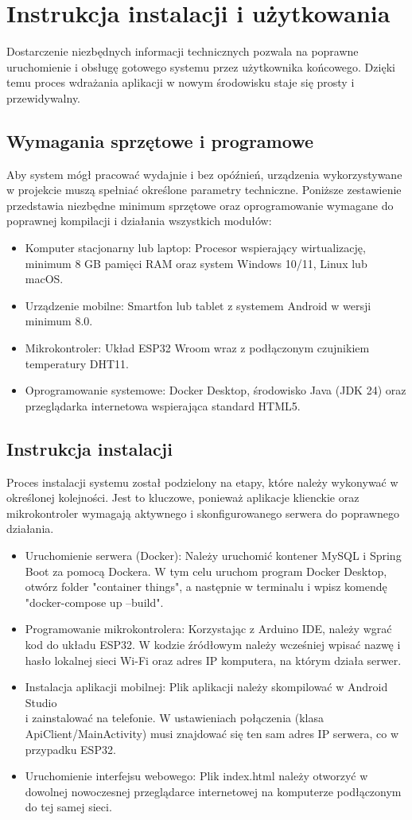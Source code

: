 \chapter{Instrukcja instalacji i użytkowania}
Dostarczenie niezbędnych informacji technicznych pozwala na poprawne uruchomienie i obsługę gotowego systemu przez użytkownika końcowego. Dzięki temu proces wdrażania aplikacji w nowym środowisku staje się prosty i przewidywalny.

\section{Wymagania sprzętowe i programowe}
Aby system mógł pracować wydajnie i bez opóźnień, urządzenia wykorzystywane \\ w projekcie muszą spełniać określone parametry techniczne. Poniższe zestawienie przedstawia niezbędne minimum sprzętowe oraz oprogramowanie wymagane do poprawnej kompilacji i działania wszystkich modułów:
\begin{itemize}
	\item Komputer stacjonarny lub laptop: Procesor wspierający wirtualizację, minimum 8 GB pamięci RAM oraz system Windows 10/11, Linux lub macOS.
	\item Urządzenie mobilne: Smartfon lub tablet z systemem Android w wersji minimum 8.0.
	\item Mikrokontroler: Układ ESP32 Wroom wraz z podłączonym czujnikiem temperatury DHT11.
	\item Oprogramowanie systemowe: Docker Desktop, środowisko Java (JDK 24) oraz przeglądarka internetowa wspierająca standard HTML5.
\end{itemize}
\section{Instrukcja instalacji}
Proces instalacji systemu został podzielony na etapy, które należy wykonywać w określonej kolejności. Jest to kluczowe, ponieważ aplikacje klienckie oraz mikrokontroler wymagają aktywnego i skonfigurowanego serwera do poprawnego działania.
\begin{itemize}
	\item Uruchomienie serwera (Docker): Należy uruchomić kontener MySQL i Spring Boot za pomocą Dockera. W tym celu uruchom program Docker Desktop, otwórz folder "container things", a następnie w terminalu i wpisz komendę "docker-compose up --build".
	\item Programowanie mikrokontrolera: Korzystając z Arduino IDE, należy wgrać kod do układu ESP32. W kodzie źródłowym należy wcześniej wpisać nazwę i hasło lokalnej sieci Wi-Fi oraz adres IP komputera, na którym działa serwer.
	\item Instalacja aplikacji mobilnej: Plik aplikacji należy skompilować w Android Studio\\ i zainstalować na telefonie. W ustawieniach połączenia (klasa ApiClient/MainActivity) musi znajdować się ten sam adres IP serwera, co w przypadku ESP32.
	\item Uruchomienie interfejsu webowego: Plik index.html należy otworzyć w dowolnej nowoczesnej przeglądarce internetowej na komputerze podłączonym do tej samej sieci.
\end{itemize}


